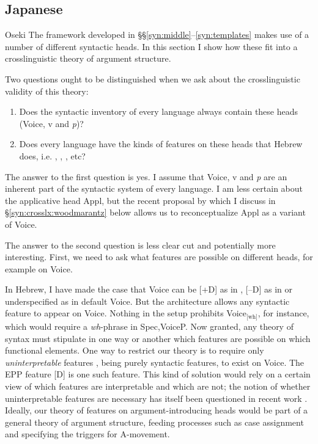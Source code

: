 	\subsection{Japanese} \label{i:i:jap}
Oseki
The framework developed in \S\S\ref{syn:middle}--\ref{syn:templates} makes use of a number of different syntactic heads. In this section I show how these fit into a crosslinguistic theory of argument structure.

Two questions ought to be distinguished when we ask about the crosslinguistic validity of this theory:
\begin{enumerate}
	\item Does the syntactic inventory of every language always contain these heads (Voice, v and \emph{p})?
	\item Does every language have the kinds of features on these heads that Hebrew does, i.e. {\vd}, \pz, \va, etc?
\end{enumerate}
The answer to the first question is yes. I assume that Voice, v and \emph{p} are an inherent part of the syntactic system of every language. I am less certain about the applicative head Appl, but the recent proposal by \cite{woodmarantz15} which I discuss in \S\ref{syn:crosslx:woodmarantz} below allows us to reconceptualize Appl as a variant of Voice.

The answer to the second question is less clear cut and potentially more interesting. First, we need to ask what features are possible on different heads, for example on Voice.

In Hebrew, I have made the case that Voice can be [+D] as in \vd, [--D] as in {\vz} or underspecified as in default Voice. But the architecture allows any syntactic feature to appear on Voice. Nothing in the setup prohibits Voice$_{\text{[wh]}}$, for instance, which would require a \emph{wh}-phrase in Spec,VoiceP. Now granted, any theory of syntax must stipulate in one way or another which features are possible on which functional elements. One way to restrict our theory is to require only \emph{uninterpretable} features \citep{chomsky95}, being purely syntactic features, to exist on Voice. The EPP feature [D] is one such feature. This kind of solution would rely on a certain view of which features are interpretable and which are not; the notion of whether uninterpretable features are necessary has itself been questioned in recent work \citep{preminger14mit}. Ideally, our theory of features on argument-introducing heads would be part of a general theory of argument structure, feeding processes such as case assignment and specifying the triggers for A-movement.

